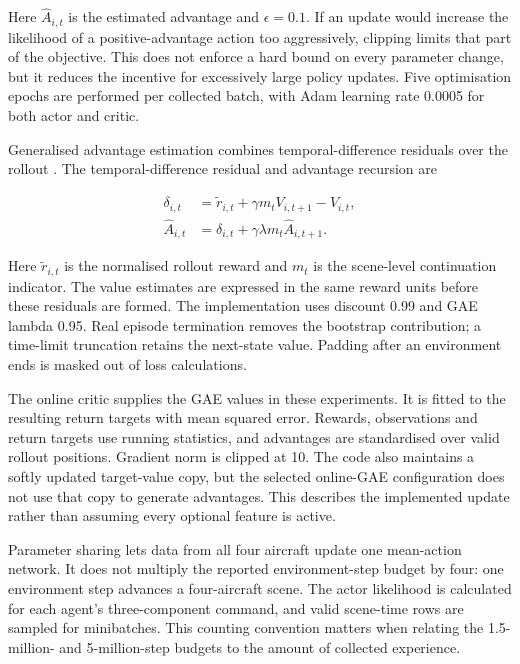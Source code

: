 Here \(\widehat A_{i,t}\) is the estimated advantage and \(\epsilon=0.1\). If an update would increase the likelihood of a positive-advantage action too aggressively, clipping limits that part of the objective. This does not enforce a hard bound on every parameter change, but it reduces the incentive for excessively large policy updates. Five optimisation epochs are performed per collected batch, with Adam learning rate 0.0005 for both actor and critic.

Generalised advantage estimation combines temporal-difference residuals over the rollout \cite{gae2016}. The temporal-difference residual and advantage recursion are

\begin{align}
\delta_{i,t}&=\widetilde r_{i,t}+\gamma m_t V_{i,t+1}-V_{i,t},\label{eq:td}\\
\widehat A_{i,t}&=\delta_{i,t}+\gamma\lambda m_t\widehat A_{i,t+1}.\label{eq:gae}
\end{align}

Here \(\widetilde r_{i,t}\) is the normalised rollout reward and \(m_t\) is the scene-level continuation indicator. The value estimates are expressed in the same reward units before these residuals are formed. The implementation uses discount 0.99 and GAE lambda 0.95. Real episode termination removes the bootstrap contribution; a time-limit truncation retains the next-state value. Padding after an environment ends is masked out of loss calculations.

The online critic supplies the GAE values in these experiments. It is fitted to the resulting return targets with mean squared error. Rewards, observations and return targets use running statistics, and advantages are standardised over valid rollout positions. Gradient norm is clipped at 10. The code also maintains a softly updated target-value copy, but the selected online-GAE configuration does not use that copy to generate advantages. This describes the implemented update rather than assuming every optional feature is active.

Parameter sharing lets data from all four aircraft update one mean-action network. It does not multiply the reported environment-step budget by four: one environment step advances a four-aircraft scene. The actor likelihood is calculated for each agent's three-component command, and valid scene-time rows are sampled for minibatches. This counting convention matters when relating the 1.5-million- and 5-million-step budgets to the amount of collected experience.

